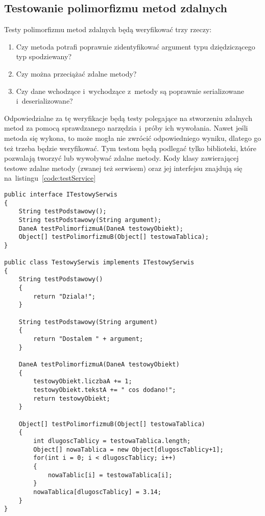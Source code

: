 \subsection{Testowanie polimorfizmu metod zdalnych}
Testy polimorfizmu metod zdalnych będą weryfikować trzy rzeczy:
\begin{enumerate}
	\item Czy metoda potrafi poprawnie zidentyfikować argument typu dziędziczącego typ spodziewany?
	\item Czy można przeciążać zdalne metody?
	\item Czy dane wchodzące i~wychodzące z~metody są poprawnie serializowane i~deserializowane?
\end{enumerate}

Odpowiedzialne za tę weryfikacje będą testy polegające na stworzeniu zdalnych metod za pomocą sprawdzanego narzędzia i~próby ich wywołania.
Nawet jeśli metoda się wykona, to może mogła nie zwrócić odpowiedniego wyniku, dlatego go też trzeba będzie weryfikować.
Tym testom będą podlegać tylko biblioteki, które pozwalają tworzyć lub wywoływać zdalne metody.
Kody klasy zawierającej testowe zdalne metody (zwanej też serwisem) oraz jej interfejsu znajdują się na~listingu~\ref{code:testService}

\begin{lstlisting}[float, frame=single, caption={Przykładowa zdalna metoda testowana pod kątem polimorfizmu}, label=code:testService]
public interface ITestowySerwis
{
    String testPodstawowy();
    String testPodstawowy(String argument);    
    DaneA testPolimorfizmuA(DaneA testowyObiekt);    
    Object[] testPolimorfizmuB(Object[] testowaTablica);
}

public class TestowySerwis implements ITestowySerwis
{
    String testPodstawowy()
    {
        return "Dziala!";
    }
        
    String testPodstawowy(String argument)
    {
        return "Dostalem " + argument;
    }
    
    DaneA testPolimorfizmuA(DaneA testowyObiekt)
    {
        testowyObiekt.liczbaA += 1;
        testowyObiekt.tekstA += " cos dodano!";
        return testowyObiekt;
    }
    
    Object[] testPolimorfizmuB(Object[] testowaTablica)
    {
        int dlugoscTablicy = testowaTablica.length;
        Object[] nowaTablica = new Object[dlugoscTablicy+1];
        for(int i = 0; i < dlugoscTablicy; i++)
        {
            nowaTablic[i] = testowaTablica[i];
        }
        nowaTablica[dlugoscTablicy] = 3.14;
    }
}
\end{lstlisting}

